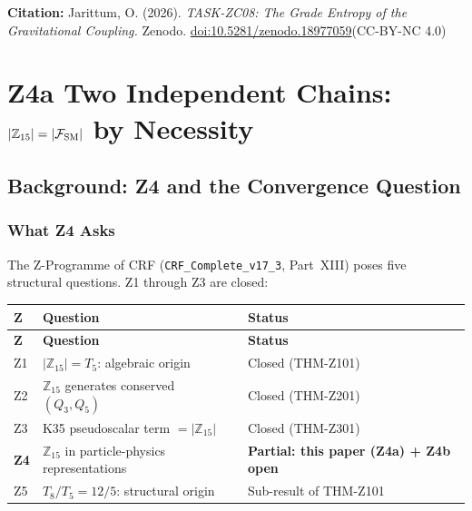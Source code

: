 \documentclass[12pt, a4paper]{article}
\begin{document}
\medskip
\begin{center}
\textbf{Citation:} Jarittum, O. (2026).
\textit{TASK-ZC08: The Grade Entropy of the Gravitational Coupling.}
Zenodo. \href{https://doi.org/10.5281/zenodo.18977059}%
{doi:10.5281/zenodo.18977059}\quad (CC-BY-NC 4.0)
\end{center}

\bigskip


\section{Z4a Two Independent Chains: $|\mathbb{Z}_{15}| = |\mathcal{F}_{\rm SM}|$ by Necessity}
\label{sec:z4a-twochains}

\subsection{Background: Z4 and the Convergence Question}
\label{sec:background}

\subsubsection{What Z4 Asks}

The Z-Programme of CRF (\texttt{CRF\_Complete\_v17\_3}, Part~XIII)
poses five structural questions. Z1 through Z3 are closed:

{\small
\setlength{\LTpre}{4pt}
\setlength{\LTpost}{4pt}
\renewcommand{\arraystretch}{1.30}
\begin{longtable}{>{\centering\arraybackslash}p{0.8cm}
                  >{\raggedright\arraybackslash}p{8.0cm}
                  >{\centering\arraybackslash}p{3.0cm}}
\toprule
\textbf{Z} & \textbf{Question} & \textbf{Status} \\
\midrule
\endfirsthead
\toprule
\textbf{Z} & \textbf{Question} & \textbf{Status} \\
\midrule
\endhead
\bottomrule
\endlastfoot
Z1 & $|\mathbb{Z}_{15}| = T_5$: algebraic origin
  & Closed (THM-Z101) \\
Z2 & $\mathbb{Z}_{15}$ generates conserved $(Q_3, Q_5)$
  & Closed (THM-Z201) \\
Z3 & K35 pseudoscalar term $= |\mathbb{Z}_{15}|$
  & Closed (THM-Z301) \\
\textbf{Z4} & $\mathbb{Z}_{15}$ in particle-physics representations
  & \textbf{Partial: this paper (Z4a) + Z4b open} \\
Z5 & $T_8/T_5 = 12/5$: structural origin
  & Sub-result of THM-Z101 \\
\end{longtable}
}
\end{document}
